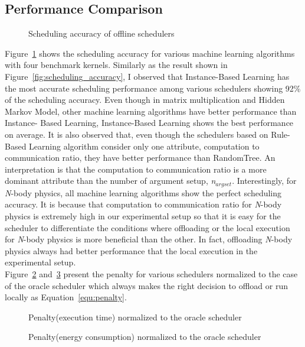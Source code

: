 \subsection{Performance Comparison}
\label{scheduler:offline_perf}
%
\begin{figure}
\centering
{}
\caption{Scheduling accuracy of offline schedulers}
\label{fig:offline_accuracy}
\end{figure}
%
Figure~\ref{fig:offline_accuracy} shows the scheduling accuracy for various machine learning
algorithms with four benchmark kernels.
%
Similarly as the result shown in Figure~\ref{fig:scheduling_accuracy}, I observed that
Instance-Based Learning has the most accurate scheduling performance
among various schedulers showing 92\% of the scheduling accuracy.
%
Even though in matrix multiplication and Hidden Markov Model,
other machine learning algorithms have better performance than Instance-
Based Learning, Instance-Based Learning shows the best performance on average.
%
It is also observed that, even though the schedulers based on Rule-Based
Learning algorithm consider only one attribute,
computation to communication ratio, they have better performance than
RandomTree.
%
An interpretation is that the computation to communication ratio is a
more dominant attribute than the number of argument setup, {\it n$_{argset}$}.
%
Interestingly, for {\it N}-body physics, all machine learning
algorithms show the perfect scheduling accuracy.
%
It is because that computation to communication ratio for
{\it N}-body physics is extremely high in our experimental setup
so that it is easy for the scheduler to differentiate the conditions 
where offloading or the local execution for {\it N}-body physics 
is more beneficial than the other.
%
In fact, offloading {\it N}-body physics always had better
performance that the local execution in the experimental setup.\\
%
Figure~\ref{fig:penalty_time} and~\ref{fig:penalty_energy} 
present the penalty for various schedulers
normalized to the case of the oracle scheduler which always makes the
right decision to offload or run locally as Equation~\eqref{equ:penalty}.
%
\begin{figure}
\centering
{}
\caption{Penalty(execution time) normalized to the oracle scheduler}
\label{fig:penalty_time}
\end{figure}
%
\begin{figure}
\centering
{}
\caption{Penalty(energy consumption) normalized to the oracle scheduler}
\label{fig:penalty_energy}
\end{figure}
